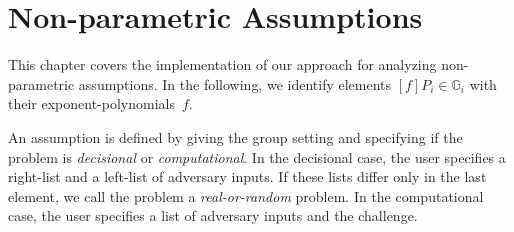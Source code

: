 \chapter{Non-parametric Assumptions}

This chapter covers the implementation of our approach for
analyzing non-parametric assumptions.
In the following, we identify elements $[f]P_i \in \mathbb{G}_i$ with
  their exponent-polynomials~$f$.

An assumption is defined by giving the group setting and
  specifying if the problem is \emph{decisional} or \emph{computational}.
In the decisional case, the user specifies a right-list and a left-list of
  adversary inputs.
If these lists differ only in the last element, we call the problem
  a \emph{real-or-random} problem.
In the computational case, the user specifies a list of adversary inputs
  and the challenge.
